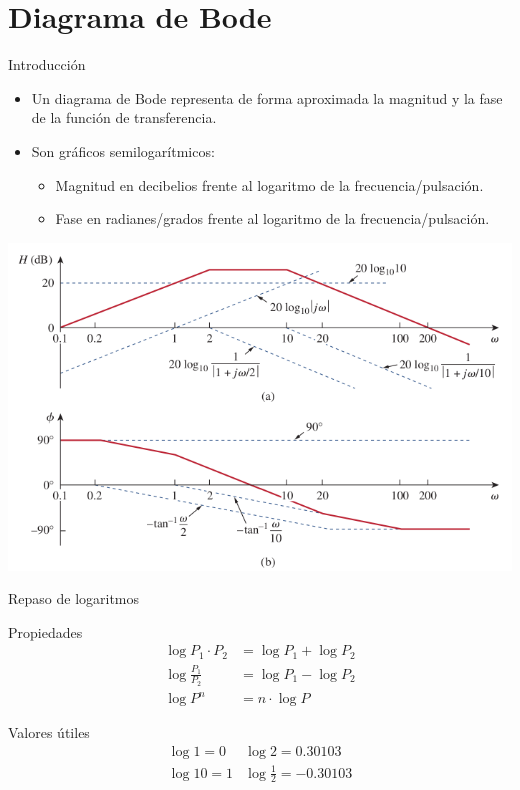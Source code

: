 \documentclass[xcolor={usenames,svgnames,dvipsnames}]{beamer}
\begin{document}
\section{Diagrama de Bode}
\label{sec:orged5c197}

\begin{frame}[label={sec:org42a511a}]{Introducción}
\begin{itemize}
\item Un diagrama de Bode representa de forma \alert{aproximada} la magnitud y la fase de la función de transferencia.
\item Son \alert{gráficos semilogarítmicos}:
\begin{itemize}
\item Magnitud en \alert{decibelios} frente al logaritmo de la frecuencia/pulsación.
\item Fase en radianes/grados frente al logaritmo de la frecuencia/pulsación.
\end{itemize}
\end{itemize}
\begin{center}
\includegraphics[height=0.5\textheight]{../figs/Bode.pdf}
\end{center}
\end{frame}

\begin{frame}[label={sec:orgb59b4e6}]{Repaso de logaritmos}
\begin{block}{Propiedades}
\begin{align*}
  \log {P_1 \cdot P_2} &= \log P_1 + \log P_2\\
  \log \frac{P_1}{P_2} &= \log P_1 - \log P_2\\
  \log P^n &= n \cdot \log P
\end{align*}
\end{block}

\begin{block}{Valores útiles}
\[
\begin{array}{ll}
  \log 1 = 0 & \log 2 = 0.30103\\
  \log 10 = 1 & \log \frac{1}{2} = -0.30103
\end{array}
\]
\end{block}
\end{frame}
\end{document}
